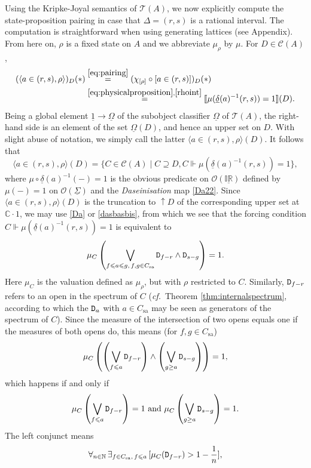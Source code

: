 \documentclass[12pt]{article}
\newcommand{\IR}{\mathbb{IR}}
\newcommand{\beq}{\begin{equation}}
\newcommand{\eeq}{\end{equation}}
\newcommand{\er}{\eqref}
\newcommand{\dl}{\delta} \newcommand{\Dl}{\Delta}
\newcommand{\rh}{\rho} \newcommand{\sg}{\sigma}
\newcommand{\ch}{\chi} \newcommand{\ps}{\psi} \newcommand{\Ps}{\Psi}
\newcommand{\CA}{{\mathcal A}} \newcommand{\CB}{{\mathcal B}}
\newcommand{\CO}{{\mathcal O}} \newcommand{\CP}{{\mathcal P}}
\newcommand{\C}{{\mathbb C}} \newcommand{\D}{{\mathbb D}}
\newcommand{\alg}[1]{\ensuremath{#1}}
\newcommand{\functor}[1]{\ensuremath{\underline{#1}}}
\newcommand{\after}{\circ}
\newcommand{\context}{\ensuremath{\mathcal{C}}}
\newcommand{\asstopos}{\ensuremath{\mathcal{T}}}
\newcommand{\interpretation}[1]{\ensuremath{\llbracket{#1}\rrbracket}}
\newcommand{\sa}{\ensuremath{_{\mathrm{sa}}}}
\newcommand{\prop}[1]{\ensuremath{\mbox{\texttt{#1}}}}
\newcommand{\field}[1]{\ensuremath{\mathbb{#1}}}
\renewcommand{\CA}{\mathcal{C}(A)}
\newcommand{\TA}{\mathcal{T}(A)}
\newcommand{\ulS}{\functor{\Sigma}}
\renewcommand{\TA}{\asstopos(\alg{A})}
\renewcommand{\CA}{\context(\alg{A})}
\begin{document}
Using the Kripke-Joyal semantics of $\TA$, we now explicitly
compute the state-proposition pairing in case that $\Dl=(r,s)$ is a rational interval.
 The computation is straightforward
when using generating lattices (see Appendix). From here on, $\rh$ is a fixed state on $A$ and we abbreviate
$\mu_{\rho}$ by $\mu$. For $D \in \CA$,
\begin{align*}
  (\langle a \in (r,s), \rho \rangle)_D(*)
  & \stackrel{\eqref{eq:pairing}}{=}
    (\ch_{[\rh]} \after [a \in (r,s)])_D(*) \\
  & \stackrel{\eqref{eq:physicalproposition},\eqref{rhoint}}{=}
    \interpretation{\mu(\underline{\dl}(a)^{-1}(r,s))=1}(D).
\end{align*}
Being a global element $\underline{1} \to \underline{\Omega}$ of
the subobject classifier $\functor{\Omega}$ of $\TA$, the right-hand side
is an element of  the set $\functor{\Omega}(D)$, and hence an upper set on $D$.
With slight abuse of notation, we simply call the latter
$\langle a \in (r,s), \rho \rangle(D)$.
It follows that
\beq  \langle a \in (r,s), \rho \rangle(D)=
 \{ C\in \CA \mid C\supseteq D,  C \Vdash \mu(\underline{\dl}(a)^{-1}(r,s))=1 \},\label{truth}
\eeq
where $\mu\circ\underline{\dl}(a)^{-1}(-)=1$ is the obvious predicate on $\CO(\underline{\IR})$
defined by $\mu(-)=1$ on $\CO(\ulS)$ and the {\it Daseinisation} map \er{Da22}.
Since $\langle a \in (r,s), \rho \rangle(D)$ is the truncation to $\uparrow\! D$ of the corresponding
upper set at $\C\cdot 1$, we may use  \er{Da} or \er{dasbasbis}, from which  we see that the forcing condition \hbox{$C \Vdash
\mu(\underline{\dl}(a)^{-1}(r,s))=1$} is equivalent to
\[
 \mu_C\left( \bigvee_{f \leqslant a \leqslant g,\, f,g\in C\sa} \prop{D}_{f-r} \wedge
  \prop{D}_{s-g} \right) = 1.
\]
Here $\mu_C$ is the valuation defined as $\mu_{\rh}$, but with $\rho$
restricted to $C$. Similarly, $\prop{D}_{f-r}$ refers to an open in
the spectrum of $C$ ({\it cf.}\ Theorem \ref{thm:internalspectrum},
according to which the $\prop{D}_a$ with $a\in C\sa$ may be seen as
generators of the spectrum of $C$). Since the measure of the
intersection of two opens equals one if the measures of both opens do,
this means (for $f,g\in C\sa$)
\[
 \mu_C\left(\left( \bigvee_{f \leqslant a} \prop{D}_{f-r} \right) \wedge
            \left( \bigvee_{g \geq a} \prop{D}_{s-g} \right)\right) = 1,
\]
which happens if and only if
\[
 \mu_C\left( \bigvee_{f \leqslant a} \prop{D}_{f-r} \right) = 1
  \mbox{  and  }
 \mu_C\left( \bigvee_{g \geq a} \prop{D}_{s-g} \right) = 1.
\]
The left conjunct means
\begin{equation}
 \forall_{n \in \field{N}}\, \exists_{f\in C\sa,\,  f \leqslant
  a}\, [ \mu_C(\prop{D}_{f-r}) > 1-\frac{1}{n}]\label{equals-one},
\end{equation}
\end{document}
